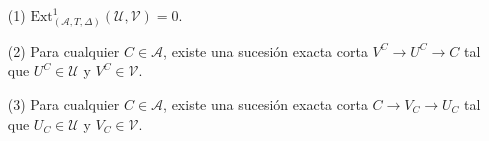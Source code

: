 \documentclass[preview]{standalone}
\begin{document}
\begin{center}
\begin{itemize} \item[(1)] $\text{Ext}^1_{(\mathscr{A}, T, \Delta)}(\mathcal{U}, \mathcal{V}) = 0$. \item[(2)] Para cualquier $C\in\mathscr{A}$, existe una sucesión exacta corta $V^C\to U^C\to C$ tal que $U^C\in\mathcal{U}$ y $V^C\in\mathcal{V}$. \item[(3)] Para cualquier $C\in\mathscr{A}$, existe una sucesión exacta corta $C\to V_C\to U_C$ tal que $U_C\in\mathcal{U}$ y $V_C\in\mathcal{V}$. \end{itemize}
\end{center}
\end{document}
